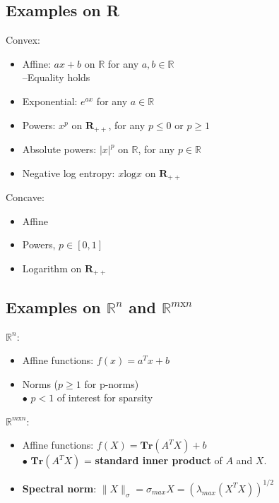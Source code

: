 \documentclass[]{article}
\newcommand{\Rn}{\mathbb{R}^{n}}
\newcommand{\Rpp}{\boldsymbol{R}_{++}}
\newcommand{\Rmn}{\mathbb{R}^{m\text{x}n}}
\newcommand{\norm}[1]{\| #1 \|}
\begin{document}
\subsection*{Examples on R}
Convex:
\begin{itemize}
	\item Affine: $ax+b$ on $\mathbb{R}$ for any $a,b \in \mathbb{R}$
	\\
	--Equality holds
	\item Exponential: $e^{ax}$ for any $a\in\mathbb{R}$
	\item Powers: $x^{p}$ on $\boldsymbol{R}_{++}$, for any $p\leq 0$ or $p\geq 1$
	\item Absolute powers: $|x|^{p}$ on $\mathbb{R}$, for any $p\in\mathbb{R}$
	\item Negative log entropy: $x\text{log}x$ on $\boldsymbol{R}_{++}$
	\\
\end{itemize}
Concave:
\begin{itemize}
	\item Affine
	\item Powers, $p\in[0,1]$
	\item Logarithm on $\Rpp$
	\\
\end{itemize}

\subsection*{Examples on $\Rn$ and $\Rmn$}
$\Rn$:
\begin{itemize}
	\item Affine functions: $f(x)=a^{T}x+b$
	\item Norms ($p\geq 1$ for p-norms)
	\\
	$\bullet$ $p < 1$ of interest for sparsity
\end{itemize}
$\Rmn$:
\begin{itemize}
	\item Affine functions: $f(X)=\textbf{Tr}(A^{T}X) + b$
	\\
	$\bullet$ $\textbf{Tr}(A^{T}X)$ = \textbf{standard inner product} of $A$ and $X$.
	\item \textbf{Spectral norm}: $\norm{X}_{\sigma} = \sigma_{max}X = (\lambda_{max}(X^{T}X))^{1/2}$\\
\end{itemize}
\end{document}
